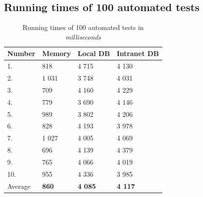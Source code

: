 \documentclass[
  print,
  table,
  nolof,
  nolot,
  nocover,
  oneside
]{fithesis3}
\begin{document}
\subsection{Running times of 100 automated tests}
\begin{table}[H]
  \begin{tabularx}{\textwidth}{XXXX}
    \toprule
    Number & Memory & Local DB & Intranet DB \\
    \midrule
    1.  &   818 & 4 715 & 4 130 \\
    2.  & 1 031 & 3 748 & 4 031 \\
    3.  &   709 & 4 160 & 4 229 \\
    4.  &   779 & 3 690 & 4 146 \\
    5.  &   989 & 3 802 & 4 206 \\
    6.  &   828 & 4 193 & 3 978 \\
    7.  & 1 027 & 4 005 & 4 069 \\ 
    8.  &   696 & 4 139 & 4 379 \\
    9.  &   765 & 4 066 & 4 019 \\
    10. &   955 & 4 336 & 3 985 \\
    \bottomrule
    Average & \textbf{860} & \textbf{4 085} & \textbf{4 117} \\
  \end{tabularx}
  \caption{Running times of 100 automated tests in \textit{milliseconds}}
  \label{tab:100tests}
\end{table}

\end{document}
